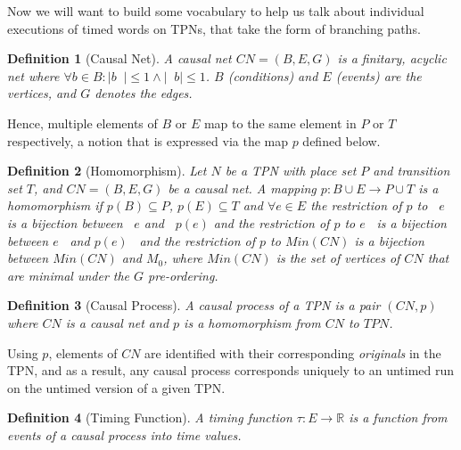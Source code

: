 \documentclass[conference]{IEEEtran}
\DeclareMathOperator*{\pre}{^\bullet}
\newtheorem{definition}{Definition}
\begin{document}
Now we will want to build some vocabulary to help us talk about individual executions of timed words on TPNs, that take the form of branching paths. 

\begin{definition}[Causal Net] \label{cn}
	A \textit{causal net} $CN = (B, E, G)$ is a finitary, acyclic net where 
	$\forall b \in B : |b \pre| \leq 1 \wedge | \pre b| \leq 1$. \linebreak $B$ (conditions) and $E$ (events) are the vertices, and $G$ denotes the edges. 
\end{definition}

Hence, multiple elements of $B$ or $E$ map to the same element in $P$ or $T$ respectively, a notion that is expressed via the map $p$ defined below. 

\begin{definition}[Homomorphism] \label{hom}  Let $N$ be a TPN with place set $P$ and transition set $T$, and ${CN = (B, E, G)}$ be a causal net. 
	A mapping $p : B \cup E \rightarrow P \cup T$ is a \textit{homomorphism} if $p(B) \subseteq P$,  $p(E) \subseteq T$ and $\forall e \in E$ the restriction of $p$ to $\pre e$ is a bijection between $\pre e$ and $\pre p(e)$ and the restriction of $p$ to $e \pre $ is a bijection between $e \pre $ and $p(e) \pre $ and the restriction of $p$ to $Min(CN)$ is a bijection between $Min(CN)$ and $M_0$, where $Min(CN)$ is the set of vertices of $CN$ that are minimal under the $G$ pre-ordering. 
\end{definition}

\begin{definition}[Causal Process]\label{cp} A \textit{causal process} of a TPN is a pair $(CN, p)$ where $CN$ is a causal net and $p$ is a homomorphism from $CN$ to $TPN$. 
\end{definition}

Using $p$, elements of $CN$ are identified with their corresponding \emph{originals} in the TPN, and as a result, any causal process corresponds uniquely to an untimed run on the untimed version of a given TPN. 

\begin{definition}[Timing Function]\label{tau} A \textit{timing function} $\tau : E \rightarrow \mathbb{R}$ is a function from events of a causal process into time values. 
\end{definition}
\end{document}
